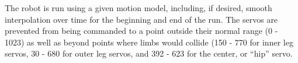 The robot is run using a given motion model, including, if desired, 
smooth interpolation over time for the beginning and end of the run. 
The servos are prevented from being commanded to a point outside their
normal range (0 - 1023) as well as beyond points where limbs would collide
(150 - 770 for inner leg servos, 30 - 680 for outer leg servos, and 392 - 623
for the center, or ``hip'' servo.
